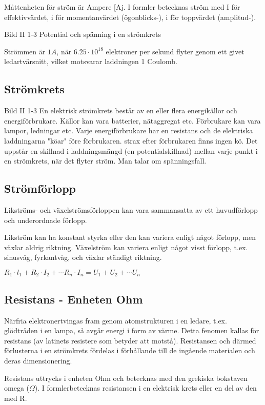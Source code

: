 Måttenheten för ström är Ampere [Aj.
I formler betecknas ström med
I för effektivvärdet,
i för momentanvärdet (ögonblicks-),
i för toppvärdet (amplitud-).

Bild II 1-3 Potential och spänning i en strömkrets

Strömmen är $1 A$, när $6.25 \cdot 10^{18}$ elektroner per sekund flyter genom ett givet
ledartvärsnitt, vilket motsvarar laddningen 1 Coulomb.

\subsection{Strömkrets}

Bild II 1-3
En elektrisk strömkrets består av en eller
flera energikällor och energiförbrukare. Källor kan vara batterier, nätaggregat etc. Förbrukare kan vara lampor, ledningar etc.
Varje energiförbrukare har en resistans
och de elektriska laddningarna "köar" före
förbrukaren. strax efter förbrukaren finns
ingen kö.
Det uppstår en skillnad i laddningsmängd
(en potentialskillnad) mellan varje punkt i en
strömkrets, när det flyter ström. Man talar om
spänningsfall.

\subsection{Strömförlopp}

Likströms- och växelströmsförloppen kan vara sammansatta av ett huvudförlopp och
underordnade förlopp.

Likström kan ha konstant styrka eller den kan variera enligt något förlopp,
men växlar aldrig riktning. Växelström kan variera enligt något
visst förlopp, t.ex. sinusvåg, fyrkantvåg, och växlar ständigt riktning.

$R_1 \cdot l_1 + R_2 \cdot I_2 + \cdots R_n \cdot I_n = U_1 + U_2 + \cdots U_n$

\subsection{Resistans - Enheten Ohm}

Närfria elektronertvingas fram genom atomstrukturen i en ledare, t.ex. glödtråden i en
lampa, så avgår energi i form av värme.
Detta fenomen kallas för resistans (av latinets resistere som betyder att motstå).
Resistansen och därmed förlusterna i en
strömkrets fördelas i förhållande till de ingående materialen och deras dimensionering.

Resistans uttrycks i enheten Ohm och betecknas med den grekiska bokstaven
omega ($\Omega$).
I formlerbetecknas resistansen i en elektrisk krets eller en del av den med R.

